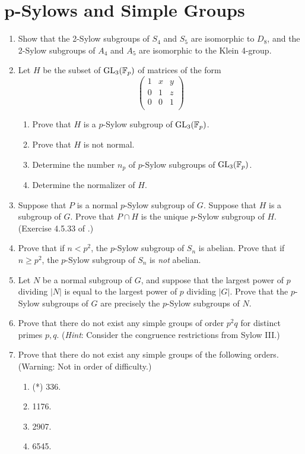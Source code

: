 \documentclass[../psets.tex]{subfiles}
\begin{document}
\section{\texorpdfstring{$\bm{p}$}{}-Sylows and Simple Groups}
\begin{enumerate}
    \item {}Show that the 2-Sylow subgroups of $S_4$ and $S_5$ are isomorphic to $D_8$, and the 2-Sylow subgroups of $A_4$ and $A_5$ are isomorphic to the Klein 4-group.
    \item Let $H$ be the subset of $\text{GL}_3(\mathbb{F}_p)$ of matrices of the form
    \begin{equation*}
        \begin{pmatrix}
            1 & x & y\\
            0 & 1 & z\\
            0 & 0 & 1\\
        \end{pmatrix}
    \end{equation*}
    \begin{enumerate}
        \item Prove that $H$ is a $p$-Sylow subgroup of $\text{GL}_3(\mathbb{F}_p)$.
        \item Prove that $H$ is not normal.
        \item Determine the number $n_p$ of $p$-Sylow subgroups of $\text{GL}_3(\mathbb{F}_p)$.
        \item Determine the normalizer of $H$.
    \end{enumerate}
    \item Suppose that $P$ is a normal $p$-Sylow subgroup of $G$. Suppose that $H$ is a subgroup of $G$. Prove that $P\cap H$ is the unique $p$-Sylow subgroup of $H$. (Exercise 4.5.33 of \textcite{bib:DummitFoote}.)
    \item Prove that if $n<p^2$, the $p$-Sylow subgroup of $S_n$ is abelian. Prove that if $n\geq p^2$, the $p$-Sylow subgroup of $S_n$ is \emph{not} abelian.
    \item Let $N$ be a normal subgroup of $G$, and suppose that the largest power of $p$ dividing $|N|$ is equal to the largest power of $p$ dividing $|G|$. Prove that the $p$-Sylow subgroups of $G$ are precisely the $p$-Sylow subgroups of $N$.
    \item Prove that there do not exist any simple groups of order $p^2q$ for distinct primes $p,q$. (\emph{Hint}: Consider the congruence restrictions from Sylow III.)
    \item Prove that there do not exist any simple groups of the following orders. (Warning: Not in order of difficulty.)
    \begin{enumerate}
        \item (*) 336.
        \item 1176.
        \item 2907.
        \item 6545.
    \end{enumerate}
\end{enumerate}
\end{document}
